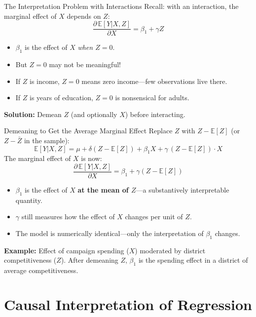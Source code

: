\documentclass[aspectratio=169]{beamer}
\numberwithin{equation}{section}
\begin{document}
\begin{frame}{The Interpretation Problem with Interactions}
Recall: with an interaction, the marginal effect of $X$ depends on $Z$:
$$\frac{\partial\, \mathbb{E}[Y|X,Z]}{\partial X}=\beta_1 +  \gamma Z$$
\pause
\begin{itemize}
\item $\beta_1$ is the effect of $X$ \emph{when $Z=0$}.
\item But $Z=0$ may not be meaningful!
\item[-] If $Z$ is income, $Z=0$ means zero income---few observations live there.
\item[-] If $Z$ is years of education, $Z=0$ is nonsensical for adults.
\end{itemize}
\bigskip\pause
\textbf{Solution:} Demean $Z$ (and optionally $X$) before interacting.
\end{frame}

\begin{frame}{Demeaning to Get the Average Marginal Effect}
Replace $Z$ with $Z - \mathbb{E}[Z]$ (or $Z - \bar{Z}$ in the sample):
$$\mathbb{E}[Y|X,Z] = \mu + \delta(Z-\mathbb{E}[Z]) + \beta_1 X + \gamma\, (Z-\mathbb{E}[Z])\cdot X$$
\pause
The marginal effect of $X$ is now:
$$\frac{\partial\, \mathbb{E}[Y|X,Z]}{\partial X}=\beta_1 + \gamma(Z - \mathbb{E}[Z])$$
\pause
\begin{itemize}
\item $\beta_1$ is the effect of $X$ \textbf{at the mean of $Z$}---a substantively interpretable quantity.
\item $\gamma$ still measures how the effect of $X$ changes per unit of $Z$.
\item The model is numerically identical---only the interpretation of $\beta_1$ changes.
\end{itemize}
\bigskip\pause
\textbf{Example:} Effect of campaign spending ($X$) moderated by district competitiveness ($Z$).  After demeaning $Z$, $\beta_1$ is the spending effect in a district of average competitiveness.
\end{frame}


\section{Causal Interpretation of Regression}
\end{document}
